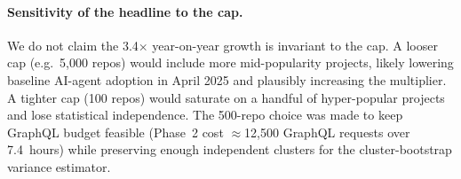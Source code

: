 \paragraph{Sensitivity of the headline to the cap.} We do not claim the 3.4$\times$ year-on-year growth is invariant to the cap. A looser cap (e.g.\ 5{,}000 repos) would include more mid-popularity projects, likely lowering baseline AI-agent adoption in April 2025 and plausibly increasing the multiplier. A tighter cap (100 repos) would saturate on a handful of hyper-popular projects and lose statistical independence. The 500-repo choice was made to keep GraphQL budget feasible (Phase~2 cost $\approx$12{,}500 GraphQL requests over 7.4~hours) while preserving enough independent clusters for the cluster-bootstrap variance estimator.
